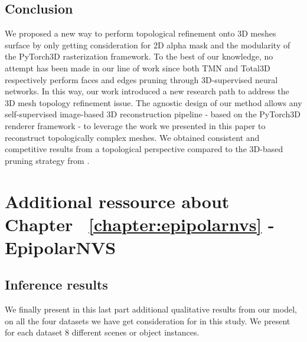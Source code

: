 \subsection{Conclusion}
\label{sec:conclusion}
We proposed a new way to perform topological refinement onto 3D meshes surface by only getting consideration for 2D alpha mask and the modularity of the PyTorch3D rasterization framework. To the best of our knowledge, no attempt has been made in our line of work since both TMN\citep{pan2019deep} and Total3D\citep{nie2020total3dunderstanding} respectively perform faces and edges pruning through 3D-supervised  neural networks. In this way, our work introduced a new research path to address the 3D mesh topology refinement issue. The agnostic design of our method allows any self-supervised image-based 3D reconstruction pipeline - based on the PyTorch3D renderer framework - to leverage the work we presented in this paper to reconstruct topologically complex meshes. We obtained consistent and competitive results from a topological perspective compared to the 3D-based pruning strategy from \citep{pan2019deep}. 



\section{Additional ressource about Chapter ~\ref{chapter:epipolarnvs} - EpipolarNVS}

\subsection{Inference results}
We finally present in this last part additional qualitative results from our model, on all the four datasets we have get consideration for in this study. We present for each dataset 8 different scenes or object instances. 

